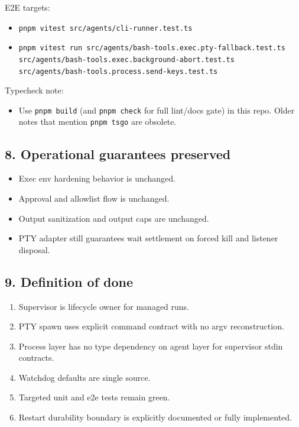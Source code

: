 E2E targets:

\begin{itemize}
  \item \texttt{pnpm vitest src/agents/cli-runner.test.ts}
  \item \texttt{pnpm vitest run src/agents/bash-tools.exec.pty-fallback.test.ts src/agents/bash-tools.exec.background-abort.test.ts src/agents/bash-tools.process.send-keys.test.ts}
\end{itemize}


Typecheck note:

\begin{itemize}
  \item Use \texttt{pnpm build} (and \texttt{pnpm check} for full lint/docs gate) in this repo. Older notes that mention \texttt{pnpm tsgo} are obsolete.
\end{itemize}


\subsection{8. Operational guarantees preserved}


\begin{itemize}
  \item Exec env hardening behavior is unchanged.
  \item Approval and allowlist flow is unchanged.
  \item Output sanitization and output caps are unchanged.
  \item PTY adapter still guarantees wait settlement on forced kill and listener disposal.
\end{itemize}


\subsection{9. Definition of done}


\begin{enumerate}
  \item Supervisor is lifecycle owner for managed runs.
  \item PTY spawn uses explicit command contract with no argv reconstruction.
  \item Process layer has no type dependency on agent layer for supervisor stdin contracts.
  \item Watchdog defaults are single source.
  \item Targeted unit and e2e tests remain green.
  \item Restart durability boundary is explicitly documented or fully implemented.
\end{enumerate}


